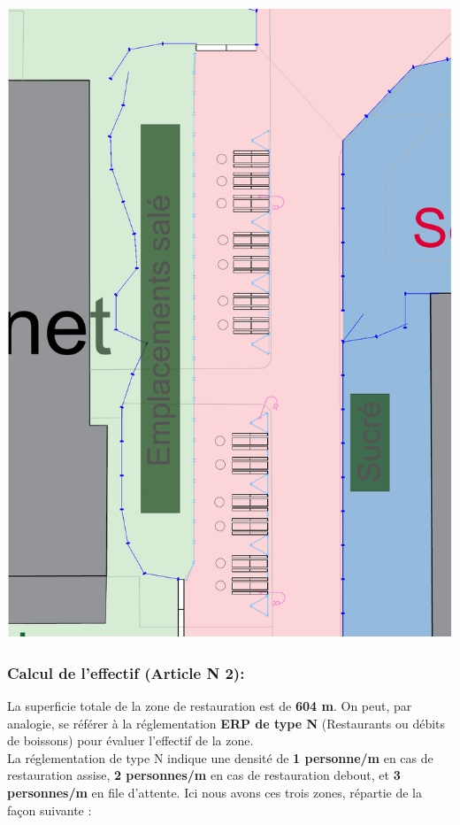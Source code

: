 \documentclass[hidelinks, paper=a4, fontsize=13pt]{report}
\begin{document}
\begin{center}
	\includegraphics[scale=0.45]{Exports/Plan_24h_44eme-Espace_Resto_zoom}
\end{center}

\subsubsection{Calcul de l'effectif (Article N 2):}
La superficie totale de la zone de restauration est de \textbf{604 m}. On peut, par analogie, se référer à la réglementation \textbf{ERP de type N} (Restaurants ou débits de boissons) pour évaluer l’effectif de la zone. \\

La réglementation de type N indique une densité de \textbf{1 personne/m} en cas de restauration assise, \textbf{2 personnes/m} en cas de restauration debout, et \textbf{3 personnes/m} en file d'attente. Ici nous avons ces trois zones, répartie de la façon suivante :
\end{document}
